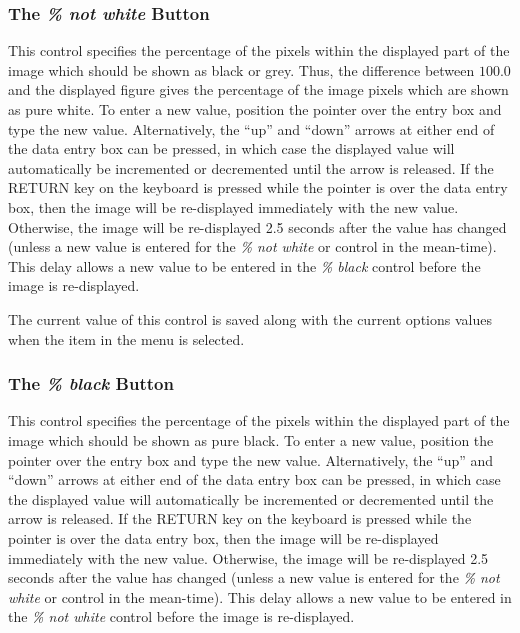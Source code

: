 \documentclass[11pt,nolof]{starlink}
\providecommand{\mylabel}[1] {\xlabel{#1}\label{#1}}
\begin{document}
\subsubsection {\mylabel{POLKA_NOT_WHITE}The \emph{\% not white} Button}
This control specifies the percentage of the pixels within the displayed
part of the image which should be shown as black or grey. Thus, the
difference between $100.0$ and the displayed figure gives the percentage
of the image pixels which are shown as pure white. To enter a new value,
position the pointer over the entry box and type the new value.
Alternatively, the ``up'' and ``down'' arrows at either end of the data
entry box can be pressed, in which case the displayed value will
automatically be incremented or decremented until the arrow is released.
If the RETURN key on the keyboard is pressed while the pointer is
over the data entry box, then the image will be re-displayed immediately
with the new value. Otherwise, the image will be re-displayed 2.5 seconds
after the value has changed (unless a new value is entered for the \emph{\% not white} or  control in
the mean-time). This delay allows a new value to be entered in the \emph{\% black} control before the image is re-displayed.

The current value of this control is saved along with the current options
values when the  item in
the  menu is selected.

\subsubsection {\mylabel{POLKA_BLACK}The \emph{\% black} Button}
This control specifies the percentage of the pixels within the displayed
part of the image which should be shown as pure black. To enter a new value,
position the pointer over the entry box and type the new value.
Alternatively, the ``up'' and ``down'' arrows at either end of the data
entry box can be pressed, in which case the displayed value will
automatically be incremented or decremented until the arrow is released.
If the RETURN key on the keyboard is pressed while the pointer is
over the data entry box, then the image will be re-displayed immediately
with the new value. Otherwise, the image will be re-displayed 2.5 seconds
after the value has changed (unless a new value is entered for the \emph{\% not white} or  control in
the mean-time). This delay allows a new value to be entered in the \emph{\% not white} control before the image is re-displayed.
\end{document}

